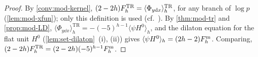 \begin{proof}
By \cref{conv:mod-kernel}, $(2-2h)F^{\mathrm{TR}}_h=\langle\Phi_{y\mathrm{d} x}\rangle^{\mathrm{TR}}_h$, for any branch of $\log p$ (\cref{lem:mod-xfun}); only this definition is used (cf.\ \cite[Def.~4.3 (4-10), Thm.~4.7 (4-30)]{Eynard:2007kz}). By \cref{thm:mod-tr} and \cref{prop:mod-LD}, $\langle\Phi_{y\dd x}\rangle^{\mathrm{TR}}_h=-(-5)^{h-1}\langle\psi H^0\rangle_h$, and the dilaton equation for the flat unit $H^0$ (\cref{lem:set-dilaton}~(i), (ii)) gives $\langle\psi H^0\rangle_h=(2h-2)F^{\mathrm{m}}_h$. Comparing, $(2-2h)F^{\mathrm{TR}}_h=(2-2h)(-5)^{h-1}F^{\mathrm{m}}_h$.
\end{proof}


